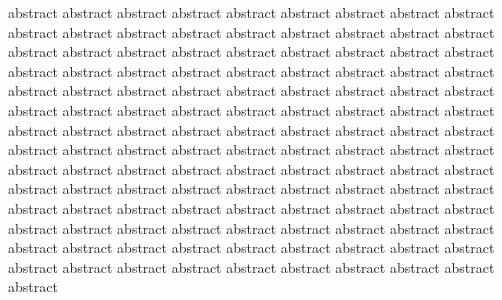 abstract abstract abstract abstract abstract abstract abstract abstract abstract abstract abstract abstract abstract
 abstract abstract abstract abstract abstract abstract abstract abstract abstract abstract abstract abstract abstract
  abstract abstract abstract abstract abstract abstract abstract abstract abstract abstract abstract abstract abstract abstract abstract
   abstract abstract abstract abstract abstract abstract abstract abstract abstract abstract abstract abstract abstract abstract abstract
    abstract abstract abstract abstract abstract abstract abstract abstract abstract abstract
     abstract abstract abstract abstract abstract abstract abstract abstract abstract abstract abstract
      abstract abstract abstract abstract abstract abstract abstract abstract abstract abstract abstract abstract abstract abstract abstract
       abstract abstract abstract abstract abstract abstract abstract abstract abstract abstract
        abstract abstract abstract abstract abstract abstract abstract abstract abstract abstract abstract abstract abstract
         abstract abstract abstract abstract abstract abstract abstract abstract abstract abstract abstract abstract
         
